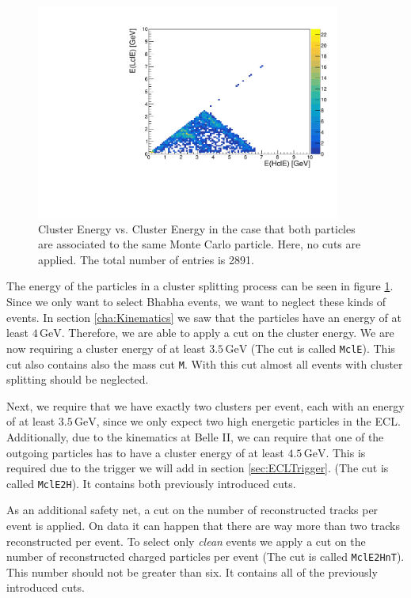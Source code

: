 \documentclass[a4paper,11pt,twosided,final,german,openbib,pdftex,listof=totoc,bibliography=totoc]{scrbook}
\begin{document}
\begin{figure}[h!]
	\centering
	\includegraphics[width=10cm]{AnhangPlots/EEdoubleMCE}
	\caption[Cluster Splitting Energy Distribution]{Cluster Energy vs. Cluster Energy in the case that both particles are associated to the same Monte Carlo particle. Here, no cuts are applied. The total number of entries is 2891.}
	\label{fig:clusterSplittingE}
\end{figure}


The energy of the particles in a cluster splitting process can be seen in figure \ref{fig:clusterSplittingE}. Since we only want to select Bhabha events, we want to neglect these kinds of events. In section \ref{cha:Kinematics} we saw that the particles have an energy of at least $4\,\textrm{GeV}$. Therefore, we are able to apply a cut on the cluster energy. We are now requiring a cluster energy of at least $3.5\,\textrm{GeV}$ (The cut is called \texttt{MclE}). This cut also contains also the mass cut \texttt{M}. With this cut almost all events with cluster splitting should be neglected.

Next, we require that we have exactly two clusters per event, each with an energy of at least $3.5\,\textrm{GeV}$, since we only expect two high energetic particles in the ECL. Additionally, due to the kinematics at Belle II, we can require that one of the outgoing particles has to have a cluster energy of at least $4.5\,\textrm{GeV}$. This is required due to the trigger we will add in section \ref{sec:ECLTrigger}. (The cut is called \texttt{MclE2H}). It contains both previously introduced cuts.

As an additional safety net, a cut on the number of reconstructed tracks per event is applied. On data it can happen that there are way more than two tracks reconstructed per event. To select only \textit{clean} events we apply a cut on the number of reconstructed charged particles per event (The cut is called \texttt{MclE2HnT}). This number should not be greater than six. It contains all of the previously introduced cuts.
\end{document}
